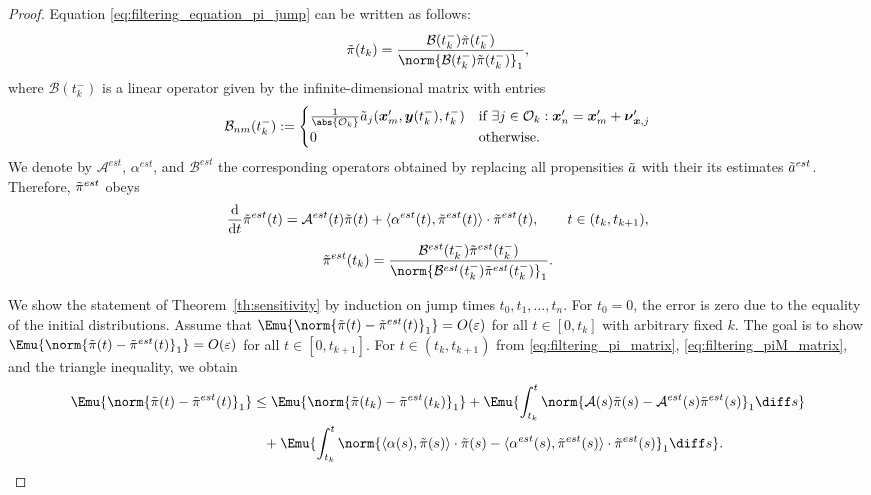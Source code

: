 \begin{proof}
Equation \eqref{eq:filtering_equation_pi_jump} can be written as follows:
\begin{equation}
    \label{eq:filtering_pi_jump_matrix}
    \Tilde{\pi}(t_k) = \frac{\mathcal{B}(t_k^-) \Tilde{\pi}(t_k^-)}{\norm{\mathcal{B}(t_k^-) \Tilde{\pi}(t_k^-)}_1},
\end{equation}
where $\mathcal{B}(t_k^-)$ is a linear operator given by the infinite-dimensional matrix with entries
\begin{align*}
    \mathcal{B}_{n m}(t_k^-) := 
    \begin{cases}
        \frac{1}{\abs{\mathcal{O}_k}} \Tilde{a}_j(\boldsymbol{x}_{m}', \boldsymbol{y}(t_k^-), t_k^-) & \text{if } \exists j \in \mathcal{O}_k: \boldsymbol{x}_{n}' = \boldsymbol{x}_{m}' + \boldsymbol{\nu}_{\boldsymbol{x}, j}' \\
        0 & \text{otherwise}.
    \end{cases}
\end{align*}
We denote by $\mathcal{A}^{est}$, $\alpha^{est}$, and $\mathcal{B}^{est}$ the corresponding operators obtained by replacing all propensities $\Tilde{a}$ with their its estimates $\Tilde{a}^{est}$. Therefore, $\Tilde{\pi}^{est}$ obeys
\begin{equation}
    \label{eq:filtering_piM_matrix}
    \frac{\mathrm{d}}{\mathrm{d} t} \Tilde{\pi}^{est}(t) = \mathcal{A}^{est}(t) \Tilde{\pi}(t) + \langle \alpha^{est}(t), \Tilde{\pi}^{est}(t) \rangle \cdot \Tilde{\pi}^{est}(t), \qquad t \in (t_k, t_{k+1}),
\end{equation} 
\begin{equation}
    \label{eq:filtering_piM_jump_matrix}
    \Tilde{\pi}^{est}(t_k) = \frac{\mathcal{B}^{est}(t_k^-) \Tilde{\pi}^{est}(t_k^-)}{\norm{\mathcal{B}^{est}(t_k^-) \Tilde{\pi}^{est}(t_k^-)}_1}.
\end{equation}

We show the statement of Theorem~\ref{th:sensitivity} by induction on jump times $t_0, t_1, \dots, t_n$. For $t_0 = 0$, the error is zero due to the equality of the initial distributions. Assume that $\Emu{\norm{\Tilde{\pi}(t) - \Tilde{\pi}^{est}(t)}_1} = O(\varepsilon)$ for all $t \in [0, t_k]$ with arbitrary fixed $k$. The goal is to show $\Emu{\norm{\Tilde{\pi}(t) - \Tilde{\pi}^{est}(t)}_1} = O(\varepsilon)$ for all $t \in [0, t_{k+1}]$. For $t \in (t_k, t_{k+1})$ from \eqref{eq:filtering_pi_matrix}, \eqref{eq:filtering_piM_matrix}, and the triangle inequality, we obtain
\begin{equation}
\label{eq:FMP_error_decomp}
\begin{aligned}
    \Emu{\norm{\Tilde{\pi}(t) - \Tilde{\pi}^{est}(t)}_1} &\leq \Emu{ \norm{ \Tilde{\pi}(t_k) - \Tilde{\pi}^{est}(t_k) }_1 } + \Emu{ \int_{t_k}^{t} \norm{\mathcal{A}(s) \Tilde{\pi}(s) - \mathcal{A}^{est}(s) \Tilde{\pi}^{est}(s) }_1 \diff s } \\ 
    &\phantom{\leq} + \Emu{ \int_{t_k}^{t} \norm{\langle \alpha(s), \Tilde{\pi}(s) \rangle \cdot \Tilde{\pi}(s) - \langle \alpha^{est}(s), \Tilde{\pi}^{est}(s) \rangle \cdot \Tilde{\pi}^{est}(s)}_1 \diff s }.
\end{aligned}
\end{equation}


\end{proof}
